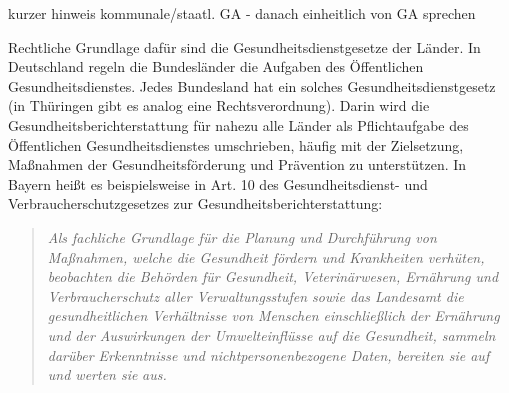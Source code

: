 \documentclass{article}
\begin{document}
kurzer hinweis kommunale/staatl. GA - danach einheitlich von GA sprechen


Rechtliche Grundlage dafür sind die Gesundheitsdienstgesetze der Länder. In Deutschland regeln die Bundesländer die Aufgaben des Öffentlichen Gesundheitsdienstes. Jedes Bundesland hat ein solches Gesundheitsdienstgesetz (in Thüringen gibt es analog eine Rechtsverordnung). Darin wird die Gesundheitsberichterstattung für nahezu alle Länder als Pflichtaufgabe des Öffentlichen Gesundheitsdienstes umschrieben, häufig mit der Zielsetzung, Maßnahmen der Gesundheitsförderung und Prävention zu unterstützen. In Bayern heißt es beispielsweise in Art. 10 des Gesundheitsdienst- und Verbraucherschutzgesetzes zur Gesundheitsberichterstattung:

\begin{quote}



\emph{Als fachliche Grundlage für die Planung und Durchführung von Maßnahmen, welche die Gesundheit fördern und Krankheiten verhüten, beobachten die Behörden für Gesundheit, Veterinärwesen, Ernährung und Verbraucherschutz aller Verwaltungsstufen sowie das Landesamt die gesundheitlichen Verhältnisse von Menschen einschließlich der Ernährung und der Auswirkungen der Umwelteinflüsse auf die Gesundheit, sammeln darüber Erkenntnisse und nichtpersonenbezogene Daten, bereiten sie auf und werten sie }\emph{aus}\emph{.}


\end{quote}
\end{document}
